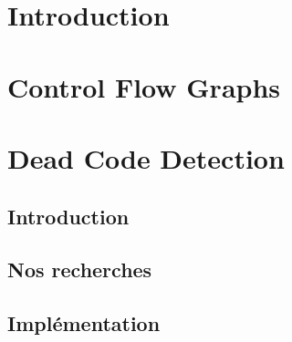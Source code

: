 \documentclass[a4paper, titlepage]{report}
\begin{document}

\chapter{Introduction} 

\chapter{Control Flow Graphs}

\chapter{Dead Code Detection}
\section{Introduction}
\section{Nos recherches}
\section{Implémentation}



\end{document}
